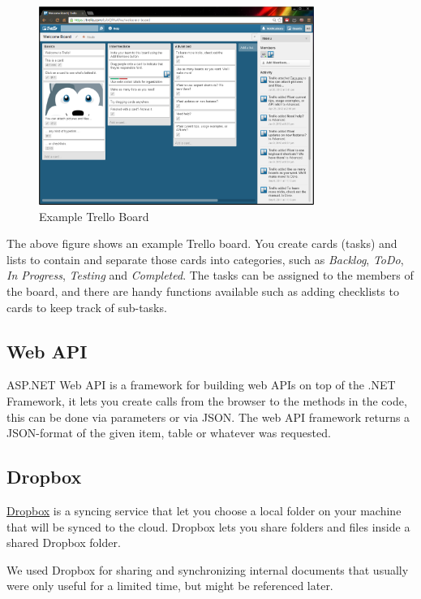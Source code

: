 \begin{figure}[H]
\centering
\includegraphics[width=0.8\textwidth]{images/Trello.png}
\caption{Example Trello Board}
\label{fig:Trello}
\end{figure}

The above figure shows an example Trello board. You create cards (tasks) and lists to contain and separate those cards into categories, such as \emph{Backlog}, \emph{ToDo}, \emph{In Progress}, \emph{Testing} and \emph{Completed}. The tasks can be assigned to the members of the board, and there are handy functions available such as adding checklists to cards to keep track of sub-tasks.

\subsection{Web API}

ASP.NET Web API is a framework for building web APIs on top of the .NET Framework, it lets you create calls from the browser to the methods in the code, this can be done via parameters or via JSON. The web API framework returns a JSON-format of the given item, table or whatever was requested.

\subsection{Dropbox}
\href{http://www.dropbox.com}{Dropbox} is a syncing service that let you choose a local folder on your machine that will be synced to the cloud. Dropbox lets you share folders and files inside a shared Dropbox folder.

We used Dropbox for sharing and synchronizing internal documents that usually were only useful for a limited time, but might be referenced later.

